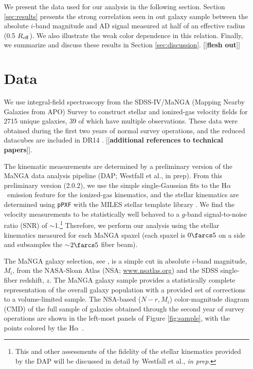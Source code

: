 \documentclass[apj,iop,revtex4,numberedappendix]{emulateapj}
\newcommand{\comment}[2][todo]{{\color{#1}[[{\bf #2}]]}}
\newcommand{\halpha}{H$\alpha$}
\begin{document}
We present the data used for our analysis in the following section.
Section \ref{sec:results} presents the strong correlation seen in out
galaxy sample between the absolute $i$-band magnitude and AD signal
measured at half of an effective radius (0.5 $R_{\rm eff}$).  We also
illustrate the weak color dependence in this relation.  Finally, we
summarize and discuss these results in Section \ref{sec:discussion}.
\comment{flesh out}

\section{Data}
\label{sec:data}

We use integral-field spectroscopy from the SDSS-IV/MaNGA (Mapping
Nearby Galaxies from APO) Survey to construct stellar and ionized-gas
velocity fields for 2715 unique galaxies, 39 of which have multiple
observations.  These data were obtained during the first two years of
normal survey operations, and the reduced datacubes are included in DR14
\citep{2017arXiv170709322A}.  \comment{additional references to
technical papers}.

The kinematic measurements are determined by a preliminary version of
the MaNGA data analysis pipeline (DAP; Westfall et al., in prep).  From
this preliminary version (2.0.2), we use the simple single-Gaussian fits
to the \halpha\ emission feature for the ionized-gas kinematics, and the
stellar kinematics are determined using {\tt pPXF}
\citep{2004PASP..116..138C, 2017MNRAS.466..798C} with the MILES stellar
template library \citep{2011A&A...532A..95F}.  We find the velocity
measurements to be statistically well behaved to a $g$-band
signal-to-noise ratio (SNR) of $\sim$1.\footnote{
%
This and other assessments of the fidelity of the stellar kinematics
provided by the DAP will be discussed in detail by Westfall et al., {\em
in prep}.}
%
Therefore, we perform our analysis using the stellar kinematics measured
for each MaNGA spaxel (each spaxel is $0\farcs5$ on a side and
subsamples the $\sim$$2\farcs5$ fiber beam).


The MaNGA galaxy selection, see \citet{2017AJ....154...86W}, is a simple
cut in absolute $i$-band magnitude, $M_i$, from the NASA-Sloan Atlas
(NSA; \url{www.nsatlas.org}) and the SDSS single-fiber redshift, $z$.
The MaNGA galaxy sample provides a statistically complete representation
of the overall galaxy population with a provided set of corrections to a
volume-limited sample.  The NSA-based ($N-r, M_i$) color-magnitude
diagram (CMD) of the full sample of galaxies obtained through the second
year of survey operations are shown in the left-most panels of Figure
\ref{fig:sample}, with the points colored by the \halpha\ .
\end{document}

